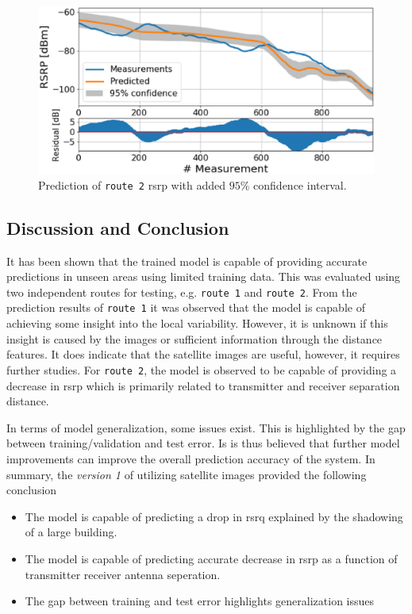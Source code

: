 \begin{figure}
    \centering
    \includegraphics{chapters/part_pathloss/drive_test_minimzation_paper/route_2_predictions_5ab708662d60543b24f857a1.eps}
    \caption{Prediction of \texttt{route 2} \gls{rsrp} with added $95\%$ confidence interval.}
    \label{fig:route_2_v1}
\end{figure}

\subsection{Discussion and Conclusion}
It has been shown that the trained model is capable of providing accurate predictions in unseen areas using limited training data. This was evaluated using two independent routes for testing, e.g. \texttt{route 1} and \texttt{route 2}. From the prediction results of \texttt{route 1} it was observed that the model is capable of achieving some insight into the local variability. However, it is unknown if this insight is caused by the images or sufficient information through the distance features. It does indicate that the satellite images are useful, however, it requires further studies. 
For \texttt{route 2}, the model is observed to be capable of providing a decrease in \gls{rsrp} which is primarily related to transmitter and receiver separation distance. 

In terms of model generalization, some issues exist. This is highlighted by the gap between training/validation and test error. Is is thus believed that further model improvements can improve the overall prediction accuracy of the system. In summary, the \emph{version 1} of utilizing satellite images provided the following conclusion

\begin{itemize}
    \item The model is capable of predicting a drop in \gls{rsrq} explained by the shadowing of a large building.
    \item The model is capable of predicting accurate decrease in \gls{rsrp} as a function of transmitter receiver antenna seperation.
    \item The gap between training and test error highlights generalization issues
\end{itemize}

